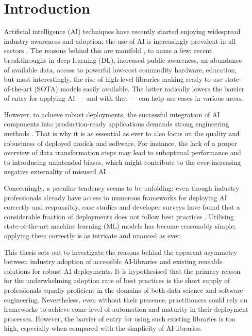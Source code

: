 \chapter{Introduction}

Artificial intelligence (AI) techniques have recently started enjoying widespread industry awareness and adoption; the use of AI is increasingly prevalent in all sectors \cite{wirtz2019artificial,bosch2021engineering}. The reasons behind this are manifold \cite{jordan2015machine}, to name a few: recent breakthroughs in deep learning (DL), increased public awareness, an abundance of available data, access to powerful low-cost commodity hardware, education, but most interestingly, the rise of high-level libraries making ready-to-use state-of-the-art (SOTA) models easily available. The latter radically lowers the barrier of entry for applying AI --- and with that --- can help use cases in various areas. 

However, to achieve robust deployments, the successful integration of AI components into production-ready applications demands strong engineering methods \cite{serban2020adoption}. That is why it is as essential as ever to also focus on the quality and robustness of deployed models and software. For instance, the lack of a proper overview of data transformation steps may lead to suboptimal performance and to introducing unintended biases, which might contribute to the ever-increasing negative externality of misused AI \cite{o2016weapons}.

Concerningly, a peculiar tendency seems to be unfolding: even though industry professionals already have access to numerous frameworks for deploying AI correctly and responsibly, case studies and developer surveys have found that a considerable fraction of deployments does not follow best practices \cite{serban2020adoption,haakman2021ai,amershi2019software,de2019understanding,sculley2015hidden}. Utilising state-of-the-art machine learning (ML) models has become reasonably simple; applying them correctly is as intricate and nuanced as ever. 

This thesis sets out to investigate the reasons behind the apparent asymmetry between industry adoption of accessible AI-libraries and existing reusable solutions for robust AI deployments. It is hypothesised that the primary reason for the underwhelming adoption rate of best practices is the short supply of professionals equally proficient in the domains of both data science and software engineering. Nevertheless, even without their presence, practitioners could rely on frameworks to achieve some level of automation and maturity in their deployment processes. However, the barrier of entry for using such existing libraries is too high, especially when compared with the simplicity of AI-libraries.

